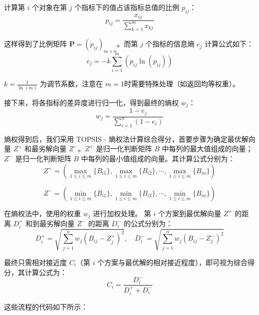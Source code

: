 计算第 $i$ 个对象在第 $j$ 个指标下的值占该指标总值的比例 $p_{ij}$：
\begin{equation}
    p_{ij} = \frac{x_{ij}}{\sum_{k=1}^{m} x_{kj}}
\end{equation}

这样得到了比例矩阵 $\mathbf{P} = (p_{ij})_{m \times n}$。而第 $j$ 个指标的信息熵 $e_j$ 计算公式如下：
\begin{equation}
    e_j = -k \sum_{i=1}^{m} (p_{ij} \ln(p_{ij}))
\end{equation}

$k = \frac{1}{\ln(m)}$ 为调节系数，注意在 $m = 1$时需要特殊处理（如返回均等权重）。

接下来，将各指标的差异度进行归一化，得到最终的熵权 $w_j$：
\begin{equation}
    w_j = \frac{1 - e_j}{\sum_{i=1}^{n} (1 - e_i)}
\end{equation}

熵权得到后，我们采用 TOPSIS - 熵权法计算综合得分，首要步骤为确定最优解向量 $Z^+$ 和最劣解向量 $Z^-$。$Z^+$ 是归一化判断矩阵 $B$ 中每列的最大值组成的向量；$Z^-$ 是归一化判断矩阵 $B$ 中每列的最小值组成的向量。其计算公式分别为：
\begin{equation}
    Z^+ = \left(\max_{1 \leq i \leq m}\{B_{i1}\}, \max_{1 \leq i \leq m}\{B_{i2}\}, \cdots, \max_{1 \leq i \leq m}\{B_{in}\}\right)
\end{equation}

\begin{equation}
    Z^- = \left(\min_{1 \leq i \leq m}\{B_{i1}\}, \min_{1 \leq i \leq m}\{B_{i2}\}, \cdots, \min_{1 \leq i \leq m}\{B_{in}\}\right)
\end{equation}

在熵权法中，使用的权重 $w_j$ 进行加权处理。
第 $i$ 个方案到最优解向量 $Z^+$ 的距离 $D_i^+$ 和到最劣解向量 $Z^-$ 的距离 $D_i^-$ 的公式分别为：
\begin{equation}
    D_i^+ = \sqrt{\sum_{j = 1}^{n} w_j (B_{ij} - Z_j^+)^2}, \quad 	D_i^- = \sqrt{\sum_{j = 1}^{n} w_j (B_{ij} - Z_j^-)^2}
\end{equation}

最终只需相对接近度 $C_i$（第 $i$ 个方案与最优解的相对接近程度），即可视为综合得分，其计算公式为：
\begin{equation}
    C_i = \frac{D_i^-}{D_i^+ + D_i^-}
\end{equation}

这些流程的代码如下所示：

